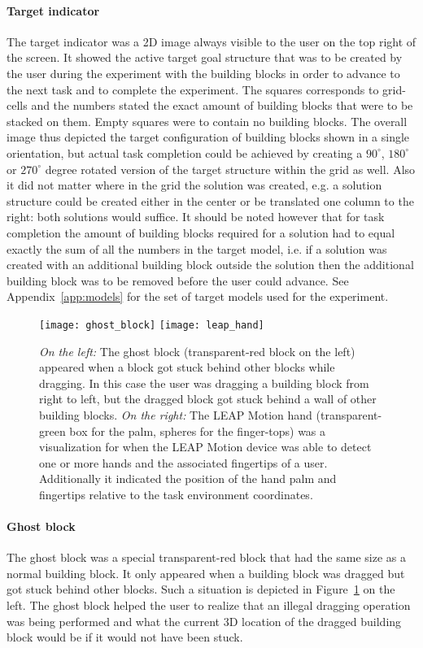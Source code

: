 \paragraph{Target indicator}
The target indicator was a 2D image always visible to the user on the top right of the screen. It showed the active target goal structure that was to be created by the user during the experiment with the building blocks in order to advance to the next task and to complete the experiment. The squares corresponds to grid-cells and the numbers stated the exact amount of building blocks that were to be stacked on them. Empty squares were to contain no building blocks. The overall image thus depicted the target configuration of building blocks shown in a single orientation, but actual task completion could be achieved by creating a $90^{\circ}$, $180^{\circ}$ or $270^{\circ}$ degree rotated version of the target structure within the grid as well. Also it did not matter where in the grid the solution was created, e.g. a solution structure could be created either in the center or be translated one column to the right: both solutions would suffice. It should be noted however that for task completion the amount of building blocks required for a solution had to equal exactly the sum of all the numbers in the target model, i.e. if a solution was created with an additional building block outside the solution then the additional building block was to be removed before the user could advance. See Appendix~\ref{app:models} for the set of target models used for the experiment.


\begin{figure}[H]
\centering
\texttt{[image: ghost\_block]}
\texttt{[image: leap\_hand]}
\caption{\label{fig:ghostblock} \textit{On the left:} The ghost block (transparent-red block on the left) appeared when a block got stuck behind other blocks while dragging. In this case the user was dragging a building block from right to left, but the dragged block got stuck behind a wall of other building blocks. \textit{On the right:} The LEAP Motion hand (transparent-green box for the palm, spheres for the finger-tops) was a visualization for when the LEAP Motion device was able to detect one or more hands and the associated fingertips of a user. Additionally it indicated the  position of the hand palm and fingertips relative to the task environment coordinates. 
}
\end{figure}

\paragraph{Ghost block}
The ghost block was a special transparent-red block that had the same size as a normal building block. It only appeared when a building block was dragged but got stuck behind other blocks. Such a situation is depicted in Figure~\ref{fig:ghostblock} on the left. The ghost block helped the user to realize that an illegal dragging operation was being performed and what the current 3D location of the dragged building block would be if it would not have been stuck.


